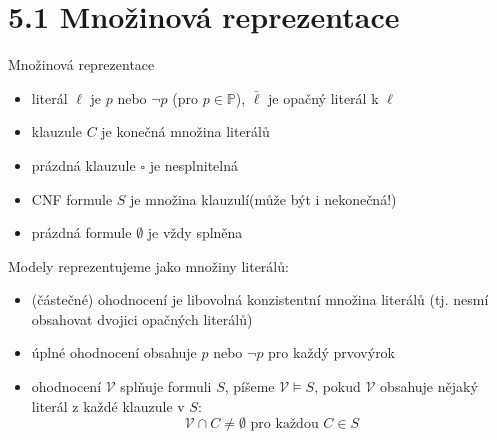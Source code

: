 \documentclass{beamer}
\begin{document}
\section{5.1 Množinová reprezentace}


\begin{frame}{Množinová reprezentace}

    \begin{itemize}
        \item \alert{literál} $\ell$ je $p$ nebo $\neg p$ (pro $p\in\mathbb P$), $\bar \ell$ je \alert{opačný literál} k $\ell$\pause
        \item \alert{klauzule} $C$ je konečná množina literálů\pause
        \item \alert{prázdná klauzule} $\square$ je nesplnitelná\pause
        \item \alert{CNF formule} $S$ je množina klauzulí\pause (může být i \alert{nekonečná}!)\pause
        \item \alert{prázdná formule} $\emptyset$ je vždy splněna
    \end{itemize}\pause
    Modely reprezentujeme jako množiny literálů:\pause
    \begin{itemize}
        \item \alert{(částečné) ohodnocení} je libovolná \alert{konzistentní} množina literálů (tj. nesmí obsahovat dvojici opačných literálů) \pause
        \item\alert{úplné ohodnocení} obsahuje $p$ nebo $\neg p$ pro každý prvovýrok\pause
        \item ohodnocení $\mathcal V$ \alert{splňuje} formuli $S$, píšeme \alert{$\mathcal V\models S$}, pokud $\mathcal V$ obsahuje nějaký literál z každé klauzule v $S$:\pause
        $$
        \mathcal V\cap C\neq\emptyset\text{ pro každou }C\in S
        $$
    \end{itemize}

\end{frame}
\end{document}
